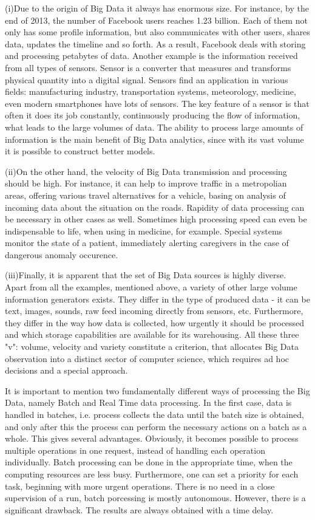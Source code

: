 (i)Due to the origin of Big Data it always has enormous size.
For instance, by the end of 2013, the number of Facebook users reaches 1.23 billion.
Each of them not only has some profile information, but also communicates with other users, shares data, updates the timeline and so forth.
As a result, Facebook deals with storing and processing petabytes of data.
Another example is the information received from all types of sensors.
Sensor is a converter that measures and transforms physical quantity into a digital signal.
Sensors find an application in various fields: manufacturing industry, transportation systems, meteorology, medicine, even modern smartphones have lots of sensors.
The key feature of a sensor is that often it does its job constantly, continuously producing the flow of information, what leads to the large volumes of data.
The ability to process large amounts of information is the main benefit of Big Data analytics, since with its vast volume it is possible to construct better models.

(ii)On the other hand, the velocity of Big Data transmission and processing should be high.
For instance, it can help to improve traffic in a metropolian areas, offering various travel alternatives for a vehicle, basing on analysis of incoming data about the situation on the roads.
Rapidity of data processing can be necessary in other cases as well.
Sometimes high processing speed can even be indispensable to life, when using in medicine, for example.
Special systems monitor the state of a patient, immediately alerting caregivers in the case of dangerous anomaly occurence. 

(iii)Finally, it is apparent that the set of Big Data sources is highly diverse.
Apart from all the examples, mentioned above, a variety of other large volume information generators exists.
They differ in the type of produced data - it can be text, images, sounds, raw feed incoming directly from sensors, etc.
Furthermore, they differ in the way how data is collected, how urgently it should be processed and which storage capabilities are available for its warehousing.
All these three "v": volume, velocity and variety constitute a criterion, that allocates Big Data observation into a distinct sector of computer science, which requires ad hoc decisions and a special approach.

It is important to mention two fundamentally different ways of processing the Big Data, namely Batch and Real Time data processing.
In the first case, data is handled in batches, i.e. process collects the data until the batch size is obtained, and only after this the process can perform the necessary actions on a batch as a whole.
This gives several advantages.
Obviously, it becomes possible to process multiple operations in one request, instead of handling each operation individually.
Batch processing can be done in the appropriate time, when the computing resources are less busy.
Furthermore, one can set a priority for each task, beginning with more urgent operations.
There is no need in a close supervision of a run, batch porcessing is mostly autonomous.
However, there is a significant drawback.
The results are always obtained with a time delay.

